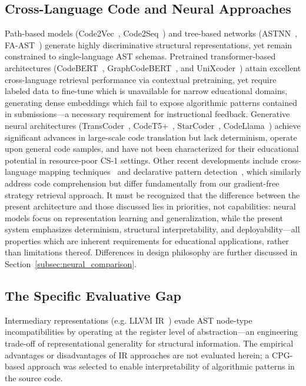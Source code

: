 \subsection{Cross-Language Code and Neural Approaches}
Path-based models (Code2Vec~\cite{ref_code2vec}, Code2Seq~\cite{ref_code2seq}) and tree-based networks (ASTNN~\cite{ref_astnn}, FA-AST~\cite{ref_fa_ast}) generate highly discriminative structural representations, yet remain constrained to single-language AST schemas. Pretrained transformer-based architectures (CodeBERT~\cite{ref_codebert}, GraphCodeBERT~\cite{ref_graphcodebert}, and UniXcoder~\cite{ref_unixcoder}) attain excellent cross-language retrieval performance via contextual pretraining, yet require labeled data to fine-tune which is unavailable for narrow educational domains, generating dense embeddings which fail to expose algorithmic patterns contained in submissions---a necessary requirement for instructional feedback. Generative neural architectures (TransCoder~\cite{ref_lachaux2020}, CodeT5+~\cite{ref_wang2023}, StarCoder~\cite{ref_starcoder}, CodeLlama~\cite{ref_codellama}) achieve significant advances in large-scale code translation but lack determinism, operate upon general code samples, and have not been characterized for their educational potential in resource-poor CS-1 settings. Other recent developments include cross-language mapping techniques~\cite{ref_naik2024} and declarative pattern detection~\cite{ref_mohan2024}, which similarly address code comprehension but differ fundamentally from our gradient-free strategy retrieval approach. It must be recognized that the difference between the present architecture and those discussed lies in priorities, not capabilities: neural models focus on representation learning and generalization, while the present system emphasizes determinism, structural interpretability, and deployability---all properties which are inherent requirements for educational applications, rather than limitations thereof. Differences in design philosophy are further discussed in Section~\ref{subsec:neural_comparison}.

\subsection{The Specific Evaluative Gap}
\label{subsec:evaluative_gap}
Intermediary representations (e.g. LLVM IR~\cite{ref_llvm}) evade AST node-type incompatibilities by operating at the register level of abstraction---an engineering trade-off of representational generality for structural information. The empirical advantages or disadvantages of IR approaches are not evaluated herein; a CPG-based approach was selected to enable interpretability of algorithmic patterns in the source code.

